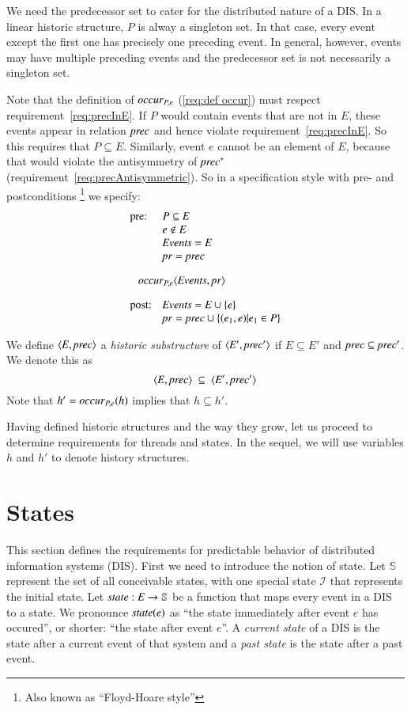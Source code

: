 \documentclass{elsarticle}
\def\id#1{\text{\em #1\/}}
\def\Events{{\mathit E}}
\begin{document}
	We need the predecessor set to cater for the distributed nature of a DIS.
	In a linear historic structure,
	$P$ is alway a singleton set.
	In that case, every event except the first one has precisely one preceding event.
	In general, however, events may have multiple preceding events and the predecessor set is not necessarily a singleton set.

	Note that the definition of $\id{occur}_{P,e}$ (\ref{req:def occur}) must respect requirement~\ref{req:precInE}.
	If $P$ would contain events that are not in $\Events$, these events appear in relation $\id{prec}$ and hence violate requirement~\ref{req:precInE}.
	So this requires that $P\subseteq\Events$.
	Similarly, event $e$ cannot be an element of $\Events$, because that would violate the antisymmetry of $\id{prec}^*$ (requirement~\ref{req:precAntisymmetric}).
	So in a specification style with pre- and postconditions%
	\footnote{Also known as ``Floyd-Hoare style''}
	we specify:
\[\begin{array}{ll}
	\text{pre:}&P\subseteq\Events\\
	&e\notin\Events\\
	&\id{Events}=\Events\\
	&\id{pr}=\id{prec}\\[1em]
	\multicolumn{2}{l}{\ \ \ \id{occur}_{P,e}\la \id{Events}, \id{pr}\ra}\\[1em]
	\text{post:}&\id{Events}=\Events\cup\{e\}\\
	&\id{pr}=\id{prec}\cup\{(e_1,e) | e_1\in P\}\\
\end{array}\]

	We define $\la \Events, \id{prec}\ra$ a {\em historic substructure} of $\la \Events', \id{prec}'\ra$
	if $\Events\subseteq\Events'$ and $\id{prec}\subseteq\id{prec}'$.
	We denote this as
\begin{equation}
	\la \Events, \id{prec}\ra\ \subseteq\ \la \Events', \id{prec}'\ra
\end{equation}
	Note that $h'=\id{occur}_{P,e}(h)$ implies that $h\subseteq h'$.

	Having defined historic structures and the way they grow, let us proceed to determine requirements for threads and states.
	In the sequel, we will use variables $h$ and $h'$ to denote history structures.

\section{States}
	This section defines the requirements for predictable behavior of distributed information systems (DIS).
	First we need to introduce the notion of state.
	Let $\mathbb S$ represent the set of all conceivable states,
	with one special state $\mathcal I$ that represents the initial state.
	Let $\id{state}:\Events\rightarrow{\mathbb S}$ be a function that maps every event in a DIS to a state.
	We pronounce $\id{state}(e)$ as ``the state immediately after event $e$ has occured'',
	or shorter: ``the state after event $e$''.
	A {\em current state} of a DIS is the state after a current event of that system
	and a {\em past state} is the state after a past event.
	
\end{document}
